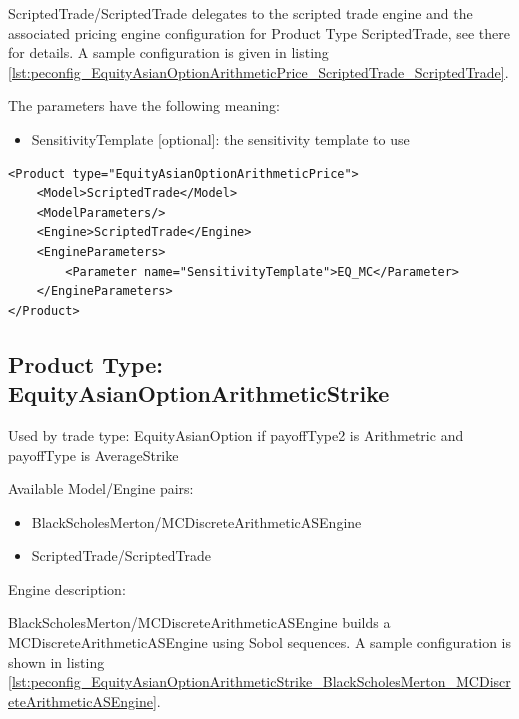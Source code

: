 ScriptedTrade/ScriptedTrade delegates to the scripted trade engine and the associated pricing engine configuration for
Product Type ScriptedTrade, see there for details. A sample configuration is given in listing
\ref{lst:peconfig_EquityAsianOptionArithmeticPrice_ScriptedTrade_ScriptedTrade}.

The parameters have the following meaning:

\begin{itemize}
\item SensitivityTemplate [optional]: the sensitivity template to use
\end{itemize}

\begin{longlisting}
\begin{verbatim}
<Product type="EquityAsianOptionArithmeticPrice">
    <Model>ScriptedTrade</Model>
    <ModelParameters/>
    <Engine>ScriptedTrade</Engine>
    <EngineParameters>
        <Parameter name="SensitivityTemplate">EQ_MC</Parameter>
    </EngineParameters>
</Product>
\end{verbatim}
\caption{Configuration for Product EquityAsianOptionArithmeticPrice, Model ScriptedTrade, Engine ScriptedTrade}
\label{lst:peconfig_EquityAsianOptionArithmeticPrice_ScriptedTrade_ScriptedTrade}
\end{longlisting}


\subsection{Product Type: EquityAsianOptionArithmeticStrike}

Used by trade type: EquityAsianOption if payoffType2 is Arithmetric and payoffType is AverageStrike

Available Model/Engine pairs:

\begin{itemize}
\item BlackScholesMerton/MCDiscreteArithmeticASEngine
\item ScriptedTrade/ScriptedTrade
\end{itemize}

Engine description:

BlackScholesMerton/MCDiscreteArithmeticASEngine builds a MCDiscreteArithmeticASEngine using Sobol sequences. A sample
configuration is shown in listing
\ref{lst:peconfig_EquityAsianOptionArithmeticStrike_BlackScholesMerton_MCDiscreteArithmeticASEngine}.

